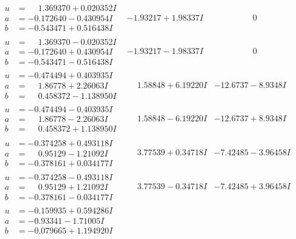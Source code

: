 \documentclass[1p]{elsarticle_modified}
\theoremstyle{definition}
\begin{document}
$$\begin{array}{c|c|c}
 \hline 
\begin{aligned}
u &= \phantom{-}1.369370 + 0.020352 I \\
a &= -0.172640 - 0.430954 I \\
b &= -0.543471 + 0.516438 I\end{aligned}
 & -1.93217 + 1.98337 I & \phantom{-0.000000 } 0 \\ \hline\begin{aligned}
u &= \phantom{-}1.369370 - 0.020352 I \\
a &= -0.172640 + 0.430954 I \\
b &= -0.543471 - 0.516438 I\end{aligned}
 & -1.93217 - 1.98337 I & \phantom{-0.000000 } 0 \\ \hline\begin{aligned}
u &= -0.474494 + 0.403935 I \\
a &= \phantom{-}1.86778 + 2.26063 I \\
b &= \phantom{-}0.458372 - 1.138950 I\end{aligned}
 & \phantom{-}1.58848 + 6.19220 I & -12.6737 - 8.9348 I \\ \hline\begin{aligned}
u &= -0.474494 - 0.403935 I \\
a &= \phantom{-}1.86778 - 2.26063 I \\
b &= \phantom{-}0.458372 + 1.138950 I\end{aligned}
 & \phantom{-}1.58848 - 6.19220 I & -12.6737 + 8.9348 I \\ \hline\begin{aligned}
u &= -0.374258 + 0.493118 I \\
a &= \phantom{-}0.95129 - 1.21092 I \\
b &= -0.378161 + 0.034177 I\end{aligned}
 & \phantom{-}3.77539 + 0.34718 I & -7.42485 - 3.96458 I \\ \hline\begin{aligned}
u &= -0.374258 - 0.493118 I \\
a &= \phantom{-}0.95129 + 1.21092 I \\
b &= -0.378161 - 0.034177 I\end{aligned}
 & \phantom{-}3.77539 - 0.34718 I & -7.42485 + 3.96458 I \\ \hline\begin{aligned}
u &= -0.159935 + 0.594286 I \\
a &= -0.93341 - 1.71005 I \\
b &= -0.079665 + 1.194920 I\end{aligned}

\end{array}$$
\end{document}
